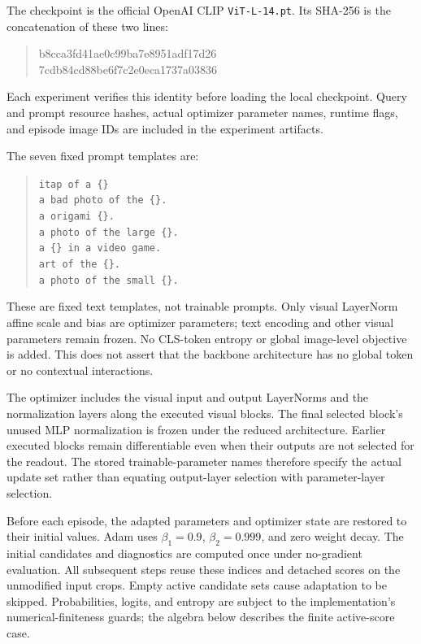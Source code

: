 The checkpoint is the official OpenAI CLIP \texttt{ViT-L-14.pt}. Its SHA-256 is the concatenation of these two lines:
\begin{quote}\small\ttfamily
b8cca3fd41ae0c99ba7e8951adf17d26\\
7cdb84cd88be6f7c2e0eca1737a03836
\end{quote}
Each experiment verifies this identity before loading the local checkpoint. Query and prompt resource hashes, actual optimizer parameter names, runtime flags, and episode image IDs are included in the experiment artifacts.

The seven fixed prompt templates are:
\begin{quote}\small
\texttt{itap of a \{\}}\\
\texttt{a bad photo of the \{\}.}\\
\texttt{a origami \{\}.}\\
\texttt{a photo of the large \{\}.}\\
\texttt{a \{\} in a video game.}\\
\texttt{art of the \{\}.}\\
\texttt{a photo of the small \{\}.}
\end{quote}
These are fixed text templates, not trainable prompts. Only visual LayerNorm affine scale and bias are optimizer parameters; text encoding and other visual parameters remain frozen. No CLS-token entropy or global image-level objective is added. This does not assert that the backbone architecture has no global token or no contextual interactions.

The optimizer includes the visual input and output LayerNorms and the normalization layers along the executed visual blocks. The final selected block's unused MLP normalization is frozen under the reduced architecture. Earlier executed blocks remain differentiable even when their outputs are not selected for the readout. The stored trainable-parameter names therefore specify the actual update set rather than equating output-layer selection with parameter-layer selection.

Before each episode, the adapted parameters and optimizer state are restored to their initial values. Adam uses $\beta_1=0.9$, $\beta_2=0.999$, and zero weight decay. The initial candidates and diagnostics are computed once under no-gradient evaluation. All subsequent steps reuse these indices and detached scores on the unmodified input crops. Empty active candidate sets cause adaptation to be skipped. Probabilities, logits, and entropy are subject to the implementation's numerical-finiteness guards; the algebra below describes the finite active-score case.

